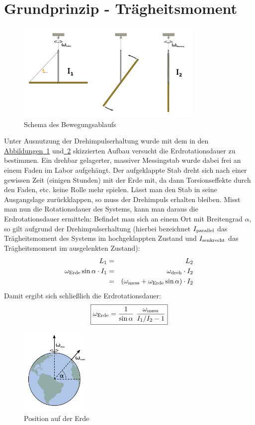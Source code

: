 \documentclass[halfparskip, 11pt]{scrartcl}
\newcommand{\ltext}[1]{\ensuremath{_{\textnormal{#1}}}}
\newcommand{\hypref}[2]{\hyperref[#2]{{#1}~\ref{#2}}}
\begin{document}
\section{Grundprinzip - Tr\"agheitsmoment}\label{sec:grundprinzip}
\begin{figure}[th]
\centering
\includegraphics[width=0.8\textwidth]{prinzip.pdf}
\caption{Schema des Bewegungsablaufs}
\label{prinzip}
\end{figure}
Unter Ausnutzung der Drehimpulserhaltung wurde mit dem in den \hypref{Abbildungen}{prinzip} und\hypref{}{Welt} skizzierten Aufbau versucht die Erdrotationsdauer zu bestimmen. Ein drehbar gelagerter, massiver Messingstab wurde dabei frei an einem Faden im Labor aufgeh\"angt. Der aufgeklappte Stab dreht sich nach einer gewissen Zeit (einigen Stunden) mit der Erde mit, da dann Torsionseffekte durch den Faden, etc. keine Rolle mehr spielen. L\"asst man den Stab in seine Ausgangslage zur\"uckklappen, so muss der Drehimpuls erhalten bleiben. Misst man nun die Rotationsdauer des Systems, kann man daraus die Erdrotationsdauer ermitteln:
Befindet man sich an einem Ort mit Breitengrad $\alpha$, so gilt aufgrund der Drehimpulserhaltung (hierbei bezeichnet $I\ltext{parallel}$ das Tr\"agheitsmoment des Systems im hochgeklappten Zustand und $I\ltext{senkrecht}$ das Tr\"agheitsmoment im ausgelenkten Zustand):
\begin{eqnarray}
L_1 &=& L_2 \\
\omega\ltext{Erde}\sin\alpha \cdot I_1 &=&
\omega\ltext{dreh} \cdot I_2 \\
&=& (\omega\ltext{mess} + \omega\ltext{Erde}\sin\alpha) \cdot I_2
\end{eqnarray}
Damit ergibt sich schließlich die Erdrotationsdauer:
\begin{equation}
\label{eq:grund}
\boxed{
\omega\ltext{Erde} =
\frac{1}{\sin\alpha}\ 
\frac{\omega\ltext{mess}}{I_1 / I_2 - 1}
}
\end{equation}

\begin{figure}[ht]
\centering
\includegraphics[width=0.3\textwidth]{welt.pdf}
\caption{Position auf der Erde}
\label{Welt}
\end{figure}
\end{document}
